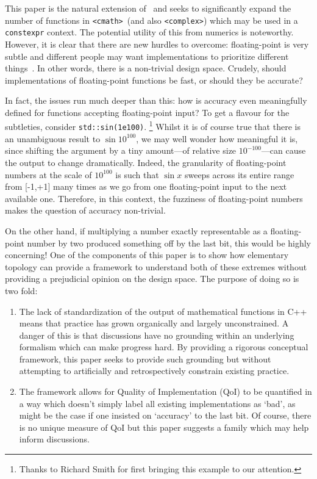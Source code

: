 \documentclass[prd,twocolumn,amsmath,amssymb,nofootinbib,eqsecnum]{revtex4-1}
\newcommand{\constexpr}{\code{constexpr}\xspace}
\newcommand{\code}[1]{{\tt #1}}
\newcommand{\header}[1]{{\tt <#1>}}
\newcommand{\cmath}{\header{cmath}}
\newcommand{\complex}{\header{complex}}
\begin{document}
This paper is the natural extension of~\cite{Rosten-constexpr} and seeks to significantly expand the number of functions in \cmath\ (and also \complex) which may be used in a \constexpr context. The potential utility of this from numerics is noteworthy. However, it is clear that there are new hurdles to overcome: floating-point is very subtle and different people may want implementations to prioritize different things~\cite{Timmons-Less}. In other words, there is a non-trivial design space. Crudely, should implementations of floating-point functions be fast, or should they be accurate?

In fact, the issues run much deeper than this: how is accuracy even meaningfully defined for functions accepting floating-point input? To get a flavour for the subtleties, consider \code{std::sin(1e100)}.%
\footnote{Thanks to Richard Smith for first bringing this example to our attention.}
Whilst it is of course true that there is an unambiguous result to $\sin 10^{100}$, we may well wonder how meaningful it is, since shifting the argument by a tiny amount---of relative size $10^{-100}$---can cause the output to change dramatically. Indeed, the granularity of floating-point numbers at the scale of $10^{100}$ is such that $\sin x$ sweeps across its entire range from [-1,+1] many times as we go from one floating-point input to the next available one. Therefore, in this context, the fuzziness of floating-point
numbers makes the question of accuracy non-trivial.

On the other hand, if multiplying a number exactly representable as a floating-point number by two produced something off by the last bit, this would be highly concerning! One of the components of this paper is to show how elementary topology can provide a framework to understand both of these
extremes without providing a prejudicial opinion on the design space. The purpose of doing so is two fold:
\begin{enumerate}
	\item The lack of standardization of the output of mathematical functions in C++ means that practice
	has grown organically and largely unconstrained. A danger of this is that discussions have no
	grounding within an underlying formalism which can make progress hard. By providing a rigorous
	conceptual framework, this paper seeks to provide such grounding but without attempting to
	artificially and retrospectively constrain existing practice.
	
	\item The framework allows for Quality of Implementation (QoI) to be quantified in a way which 
	doesn't simply label all
	existing implementations as `bad', as might be the case if one insisted on `accuracy' to the last
	bit. Of course, there is no unique measure of QoI but this paper
	suggests a family which may help inform discussions.
\end{enumerate}
\end{document}
